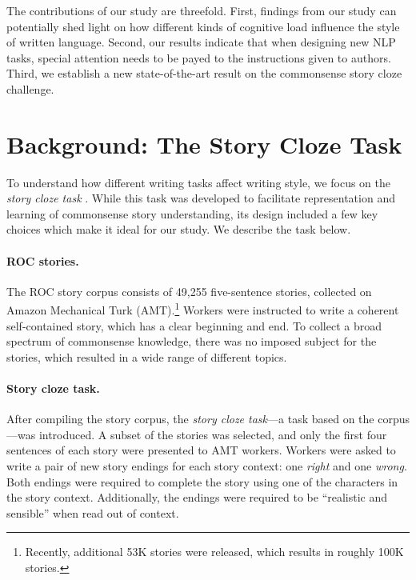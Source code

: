 \documentclass[11pt,a4paper]{article}
\newcommand{\secref}[1]{Section~\ref{ssec:#1}}
\newcommand{\isection}[2]{\section{#1}\label{ssec:#2}}
\newcommand{\com}[1]{}
\newcommand{\clinic}[1]{{\color{magenta}\textsc{[#1 --CLINIC]}}}
\begin{document}
The contributions of our study are threefold. 
First, findings from our study can potentially shed light on 
how different kinds of cognitive load influence the style of written language. 
Second, our results indicate that when designing new NLP tasks, special attention needs to be payed to the instructions given to authors.
Third, we establish a new state-of-the-art result on the commonsense story cloze challenge. 

\com{
The remainder of this paper is organized as follows. In \secref{ROC_Story} we describe the story cloze task.
We then present our model, experiments and results in Sections \ref{ssec:Model}, \ref{ssec:Experiments} and \ref{ssec:Results} respectively.
Sections \ref{ssec:Ablation} and \ref{ssec:Discussion} present a further analysis of our results  and a discussion, followed by related work and conclusions.\clinic{Omit this paragraph?}}

\isection{Background: The Story Cloze Task}{ROC_Story}
To understand how different writing tasks affect writing style, 
we focus on the \textit{story cloze task} \cite{Mostafazadeh:2016}. 
While this task was developed to facilitate representation and learning of commonsense story understanding,
its design included a few key choices which  make it ideal for our study. 
We describe the task below.




\paragraph{ROC stories.}

The ROC story corpus consists of 49,255 five-sentence 
stories, collected on Amazon Mechanical Turk (AMT).\footnote{Recently,
  additional 53K stories were released, which results in roughly
  100K stories.}
Workers were instructed to write a coherent self-contained story, which has a clear beginning and end. 
To collect a broad spectrum of commonsense knowledge, there was no imposed subject for the stories,
which resulted in a wide range of different topics.

\paragraph{Story cloze task.}
After compiling the story corpus, the {\it story cloze task}---a task based on the corpus---was introduced.
A subset of the stories was selected, and only the first four sentences of each story were presented to AMT workers.
Workers were asked to write a pair of new story endings for each story context: one {\it right} and one {\it wrong}.
Both endings were required to complete the story using one of the characters in the story context. 
Additionally,  the endings were required to be ``realistic and sensible'' \cite{Mostafazadeh:2016} when read out of context.
\end{document}
